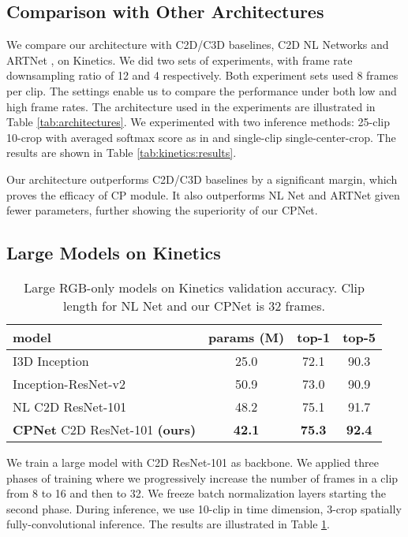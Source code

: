 \documentclass[10pt,twocolumn,letterpaper]{article}
\begin{document}
\subsection{Comparison with Other Architectures}

We compare our architecture with C2D/C3D baselines, C2D NL Networks \cite{NLNet} and ARTNet \cite{ARTNet}, on Kinetics.
We did two sets of experiments, with frame rate downsampling ratio of 12 and 4 respectively. Both experiment sets used 8 frames per clip. The settings enable us to compare the performance under both low and high frame rates.  The architecture used in the experiments
are illustrated in Table \ref{tab:architectures}. 
We experimented with two inference methods: 25-clip 10-crop with averaged softmax score as in \cite{ARTNet} and single-clip single-center-crop. The results are shown in Table \ref{tab:kinetics:results}. 

Our architecture outperforms C2D/C3D baselines by a significant margin, which proves the efficacy of CP module. It also outperforms NL Net and ARTNet given fewer parameters, further showing the superiority of our CPNet.



\subsection{Large Models on Kinetics}
\label{sec:large:kinetics}

\begin{table}[t]
\small
\setlength{\tabcolsep}{5pt}
\centering
\caption{Large RGB-only models on Kinetics validation accuracy. Clip length for NL Net and our CPNet is 32 frames.}
\vspace{-1.5ex}
\label{tab:kinetics:sota}
\begin{tabular}{l|c|c|c}
model & params (M)  & top-1 & top-5\\ \hline
I3D Inception \cite{I3D} & 25.0 & 72.1 & 90.3 \\
Inception-ResNet-v2 \cite{Activity:Kinetics:challenge:2017} & 50.9 & 73.0 & 90.9 \\ 
NL C2D ResNet-101 \cite{NLNet} & 48.2 & 75.1 & 91.7 \\ \hline
\textbf{CPNet} C2D ResNet-101 \textbf{(ours)} & \textbf{42.1} & \textbf{75.3} & \textbf{92.4}
\end{tabular}
\vspace{-1ex}
\end{table}

We train a large model with C2D ResNet-101 as backbone. We applied three phases of training where we progressively increase the number of frames in a clip from 8 to 16 and then to 32. We freeze batch normalization layers starting the second phase. During inference, we use 10-clip in time dimension, 3-crop spatially fully-convolutional inference. The results are illustrated in Table \ref{tab:kinetics:sota}.
\end{document}
